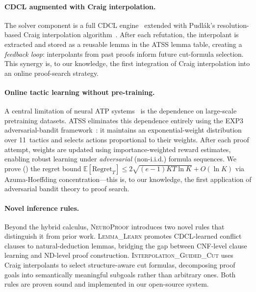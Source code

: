 \documentclass[conference]{IEEEtran}
\newcommand{\NP}{\textsc{NeuroProof}}
\newcommand{\ATSS}{\textsc{ATSS}}
\begin{document}
\paragraph{CDCL augmented with Craig interpolation.}
The solver component is a full CDCL
engine~\cite{Marques-Silva1999,EenSorensson2003} extended with
Pudl\'{a}k's resolution-based Craig interpolation
algorithm~\cite{Krajicek1995}.  After each refutation, the interpolant
is extracted and stored as a reusable lemma in the ATSS lemma table,
creating a \emph{feedback loop}: interpolants from past proofs inform
future cut-formula selection.  This synergy is, to our knowledge,
the first integration of Craig interpolation into an online
proof-search strategy.

\paragraph{Online tactic learning without pre-training.}
A central limitation of neural ATP
systems~\cite{KusumoYahata2018,DeepSeekProver2024,SongYangAnandkumar2024,
AlphaProof2025,DeepSeekProverV2}
is the dependence on large-scale pretraining datasets.  \ATSS{}
eliminates this dependence entirely using the EXP3 adversarial-bandit
framework~\cite{AuerCesaBianchiFreundSchapire2002}: it maintains an
exponential-weight distribution over 11~tactics and selects actions
proportional to their weights.  After each proof attempt, weights are
updated using importance-weighted reward estimates, enabling robust
learning under \emph{adversarial} (non-i.i.d.) formula sequences.
We prove () the regret bound
$\mathbb{E}[\mathrm{Regret}_T] \le 2\sqrt{(e\!-\!1)KT\ln K} + O(\ln K)$
via Azuma-Hoeffding concentration---this is, to our knowledge, the
first application of adversarial bandit theory to proof search.

\paragraph{Novel inference rules.}
Beyond the hybrid calculus, \NP{} introduces two novel rules that
distinguish it from prior work.  \textsc{Lemma\_Learn} promotes
CDCL-learned conflict clauses to natural-deduction lemmas, bridging
the gap between CNF-level clause learning and ND-level proof
construction.  \textsc{Interpolation\_Guided\_Cut} uses Craig
interpolants to select structure-aware cut formulas, decomposing
proof goals into semantically meaningful subgoals rather than
arbitrary ones.  Both rules are proven sound and implemented in
our open-source system.
\end{document}
